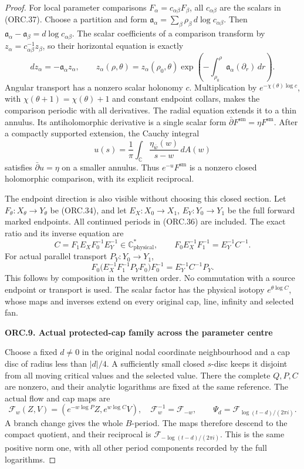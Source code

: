 \begin{proof}
For local parameter comparisons \(F_\alpha=c_{\alpha\beta}F_\beta\),
all \(c_{\alpha\beta}\) are the scalars in (ORC.37). Choose a
partition and form
\(\mathfrak a_\alpha=\sum_\beta\rho_\beta\,d\log c_{\alpha\beta}\).
Then
\(\mathfrak a_\alpha-\mathfrak a_\beta=d\log c_{\alpha\beta}\).
The scalar coefficients of a comparison transform by
\(z_\alpha=c_{\alpha\beta}^{-1}z_\beta\), so their horizontal
equation is exactly
\[
dz_\alpha=-\mathfrak a_\alpha z_\alpha,\qquad
z_\alpha(\rho,\theta)=z_\alpha(\rho_0,\theta)
\exp\!\left(-\int_{\rho_0}^{\rho}
\mathfrak a_\alpha(\partial_r)\,dr\right).
\tag{ORC.38}
\]
Angular transport has a nonzero scalar holonomy \(c\).
Multiplication by \(e^{-\chi(\theta)\log c}\), with
\(\chi(\theta+1)=\chi(\theta)+1\) and constant endpoint
collars, makes the comparison periodic with all derivatives.
The radial equation extends it to a thin annulus.
Its antiholomorphic derivative is a single scalar form
\(\bar\partial F^{\mathrm{sm}}=\eta F^{\mathrm{sm}}\).
After a compactly supported extension, the Cauchy integral
\[
u(s)=\frac1\pi\int_{\mathbb C}\frac{\eta_{\bar w}(w)}{s-w}\,dA(w)
\tag{ORC.39}
\]
satisfies \(\bar\partial u=\eta\) on a smaller annulus.
Thus \(e^{-u}F^{\mathrm{sm}}\) is a nonzero closed
holomorphic comparison, with its explicit reciprocal.

The endpoint direction is also visible without choosing
this closed section. Let \(F_\theta:X_\theta\to Y_\theta\)
be (ORC.34), and let \(E_X:X_0\to X_1\),
\(E_Y:Y_0\to Y_1\) be the full forward marked endpoints.
All continued periods in (ORC.36) are included. The exact
ratio and its inverse equation are
\[
C=F_1E_XF_0^{-1}E_Y^{-1}\in\mathbb C^*_{\mathrm{physical}},
\qquad F_0E_X^{-1}F_1^{-1}=E_Y^{-1}C^{-1}.
\tag{ORC.40}
\]
For actual parallel transport \(P_Y:Y_0\to Y_1\),
\[
F_0\bigl(E_X^{-1}F_1^{-1}P_YF_0\bigr)F_0^{-1}
=E_Y^{-1}C^{-1}P_Y.
\tag{ORC.41}
\]
This follows by composition in the written order. No
commutation with a source endpoint or transport is used.
The scalar factor has the physical isotopy
\(e^{\theta\log C}\), whose maps and inverses extend on
every original cap, line, infinity and selected fan.

\par

\medskip\noindent\textbf{ORC.9. Actual protected-cap family across the parameter centre}

\par\nobreak

Choose a fixed \(d\ne0\) in the original nodal coordinate
neighbourhood and a cap disc of radius less than \(|d|/4\).
A sufficiently small closed \(s\)-disc keeps it disjoint
from all moving critical values and the selected value.
There the complete \(Q,P,C\) are nonzero, and their
analytic logarithms are fixed at the same reference.
The actual flow and cap maps are
\[
\mathcal F_w(Z,V)=
(e^{-w\log P}Z,e^{w\log C}V),\quad
\mathcal F_w^{-1}=\mathcal F_{-w},\qquad
\Psi_d=\mathcal F_{\log(t-d)/(2\pi i)}.
\tag{ORC.42}
\]
A branch change gives the whole \(B\)-period. The maps
therefore descend to the compact quotient, and their
reciprocal is \(\mathcal F_{-\log(t-d)/(2\pi i)}\).
This is the same positive norm one, with all other
period components recorded by the full logarithms.


\end{proof}
